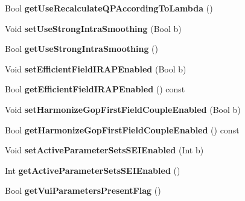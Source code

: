 \begin{DoxyCompactItemize}
\item 
\mbox{\label{class_t_enc_cfg_a1af52660c4dad7423975d38591afbb6f}} 
Bool {\bfseries get\+Use\+Recalculate\+Q\+P\+According\+To\+Lambda} ()
\item 
\mbox{\label{class_t_enc_cfg_a5d0dff8c22bb6325bb4ad4bc6e106e0d}} 
Void {\bfseries set\+Use\+Strong\+Intra\+Smoothing} (Bool b)
\item 
\mbox{\label{class_t_enc_cfg_ab98659cfd1d87b51d93f7480288e7a36}} 
Bool {\bfseries get\+Use\+Strong\+Intra\+Smoothing} ()
\item 
\mbox{\label{class_t_enc_cfg_a9e42bf46ad09130e3c696c5335a01336}} 
Void {\bfseries set\+Efficient\+Field\+I\+R\+A\+P\+Enabled} (Bool b)
\item 
\mbox{\label{class_t_enc_cfg_ac0035019e33c2064ad94193cb833f54b}} 
Bool {\bfseries get\+Efficient\+Field\+I\+R\+A\+P\+Enabled} () const
\item 
\mbox{\label{class_t_enc_cfg_a0f22e9c0bc3dc7ac2ac4b42c1e22117c}} 
Void {\bfseries set\+Harmonize\+Gop\+First\+Field\+Couple\+Enabled} (Bool b)
\item 
\mbox{\label{class_t_enc_cfg_a69cabfd477e311cd69ad5cc792b311db}} 
Bool {\bfseries get\+Harmonize\+Gop\+First\+Field\+Couple\+Enabled} () const
\item 
\mbox{\label{class_t_enc_cfg_a605daf28e9ce3e9af9d0944797713602}} 
Void {\bfseries set\+Active\+Parameter\+Sets\+S\+E\+I\+Enabled} (Int b)
\item 
\mbox{\label{class_t_enc_cfg_a6389fb4d46c152fc5d61bff9a28ba3e9}} 
Int {\bfseries get\+Active\+Parameter\+Sets\+S\+E\+I\+Enabled} ()
\item 
\mbox{\label{class_t_enc_cfg_a9f2f6ecfe8107727be9f7f3b657cf00b}} 
Bool {\bfseries get\+Vui\+Parameters\+Present\+Flag} ()
\item 
\mbox{\label{class_t_enc_cfg_a666c97af6b67398373bab657f3d98fce}} 

\end{DoxyCompactItemize}

